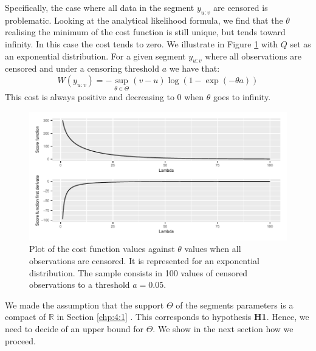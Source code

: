 Specifically, the case where all data in the segment $y_{u:v}$ are censored is problematic. Looking at the analytical likelihood formula, we find that the $\theta$ realising the minimum of the cost function is still unique, but tends toward infinity. In this case the cost tends to zero. We illustrate in Figure \ref{fig:onlycens} with $Q$ set as an exponential distribution. 
For a given segment $y_{u:v}$ where all observations are censored and under a censoring threshold $a$ we have that: 
\begin{equation} \label{chp:4:costex}
W(y_{u:v}) = -\sup_{\theta \in \Theta}(v-u)\log(1-\exp(-\theta a)) 
\end{equation}
This cost is always positive and decreasing to 0 when $\theta$  goes to infinity. 
\begin{figure}[ht]
    \centering
    \includegraphics{figs/Chap4/only_cens.pdf}
    \caption{Plot of the cost function values against $\theta$ values when all observations are censored. It is represented for an exponential distribution. The sample consists in 100 values of censored observations to a threshold $a = 0.05$.}
    \label{fig:onlycens}
\end{figure}

We made the assumption that the support $\Theta$ of the segments parameters is a compact of $\mathbb{R}$ in Section \ref{chp:4:1} . This corresponds to hypothesis \textbf{H1}. Hence, we need to decide of an upper bound for $\Theta$. We show in the next section how we proceed. 


